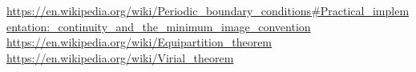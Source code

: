 \documentclass[a4paper]{article}
\begin{document}
\begin{thebibliography}{9}
    \url{https://en.wikipedia.org/wiki/Periodic_boundary_conditions#Practical_implementation:_continuity_and_the_minimum_image_convention}
    \url{https://en.wikipedia.org/wiki/Equipartition\_theorem}
    \url{https://en.wikipedia.org/wiki/Virial_theorem}
\end{thebibliography}
\end{document}

